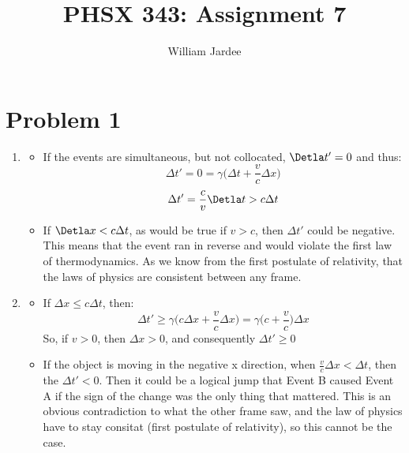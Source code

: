 \documentclass[11pt]{article}
\begin{document}
\date{}

\title{PHSX 343: Assignment 7}

\author{William Jardee}

\maketitle


\section*{Problem 1}
    \begin{enumerate}[label=\alph*)]
        Using Lorentz Translations, just replacing the variable with deltas:
        \begin{center}
            $\Delta x' = \gamma (\Delta x + v\Delta t)$ \quad $\Delta t'= \gamma \Big(\Delta t = \frac{v}{c}\Delta x\Big)$
        \end{center}
    \item
    \begin{itemize}
        \item 
        If the events are simultaneous, but not collocated, $\Detla t' = 0$ and thus:
        \[\Delta t' = 0 = \gamma \Big(\Delta t + \frac{v}{c}\Delta x\Big)\]
        \[\Delta t' = \frac{c}{v} \Detla t > c \Delta t\]
        \item
        If $\Detla x < c\Delta t$, as would be true if $v>c$, then $\Delta t'$ could be negative. This means that the event ran in reverse and would violate the first law of thermodynamics. As we know from the first postulate of relativity, that the laws of physics are consistent between any frame.
    \end{itemize}

    \item
    \begin{itemize}
        \item 
        If $\Delta  x \leq c \Delta t$,  then:
        \[\Delta t' \geq \gamma \Big( c \Delta x +\frac{v}{c}\Delta x \Big)= \gamma \Big(c +\frac{v}{c}\Big)\Delta x\]
        So, if $v>0$, then $\Delta x > 0$, and consequently $\Delta t' \geq 0$
        \item
        If the object is moving in the negative x direction, when $\frac{v}{c}\Delta x < \Delta t$, then the $\Delta t'< 0$. Then it could be a logical jump that Event B caused Event A if the sign of the change was the only thing that mattered. This is an obvious contradiction to what the other frame saw, and the law of physics have to stay consitat (first postulate of relativity), so this cannot be the case.
        

\end{itemize}
\end{enumerate}
\end{document}
